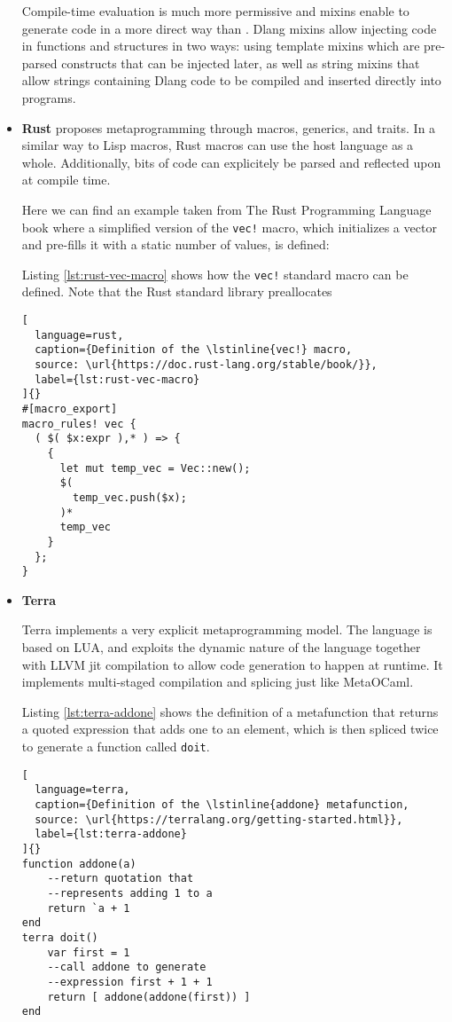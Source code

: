 \documentclass[../main]{subfiles}
\begin{document}
\begin{itemize}
Compile-time evaluation is much more permissive and mixins enable to generate
code in a more direct way than \cpp. Dlang mixins allow injecting code in
functions and structures in two ways: using template mixins
which are pre-parsed constructs that can be injected later,
as well as string mixins that allow strings containing Dlang code
to be compiled and inserted directly into programs.


\item
\textbf{Rust} proposes metaprogramming through macros, generics, and traits.
In a similar way to Lisp macros, Rust macros can use the host language
as a whole. Additionally, bits of code can explicitely be parsed and reflected
upon at compile time.

Here we can find an example taken from The Rust Programming Language
book \cite{rust-book} where a simplified version of the \lstinline{vec!} macro,
which initializes a vector and pre-fills it with a static number of values,
is defined:

Listing \ref{lst:rust-vec-macro} shows how the \lstinline{vec!} standard macro
can be defined. Note that the Rust standard library preallocates

\begin{lstlisting}[
  language=rust,
  caption={Definition of the \lstinline{vec!} macro,
  source: \url{https://doc.rust-lang.org/stable/book/}},
  label={lst:rust-vec-macro}
]{}
#[macro_export]
macro_rules! vec {
  ( $( $x:expr ),* ) => {
    {
      let mut temp_vec = Vec::new();
      $(
        temp_vec.push($x);
      )*
      temp_vec
    }
  };
}
\end{lstlisting}

\item
\textbf{Terra}

Terra\cite{terra} implements a very explicit metaprogramming model.
The language is based on LUA, and exploits the dynamic nature of the language
together with LLVM \gls{jit} compilation to allow code generation
to happen at runtime.
It implements multi-staged compilation and splicing just like MetaOCaml.

Listing \ref{lst:terra-addone} shows the definition of a metafunction that
returns a quoted expression that adds one to an element, which is then spliced
twice to generate a function called \lstinline{doit}.

\begin{lstlisting}[
  language=terra,
  caption={Definition of the \lstinline{addone} metafunction,
  source: \url{https://terralang.org/getting-started.html}},
  label={lst:terra-addone}
]{}
function addone(a)
    --return quotation that
    --represents adding 1 to a
    return `a + 1
end
terra doit()
    var first = 1
    --call addone to generate
    --expression first + 1 + 1
    return [ addone(addone(first)) ]
end
\end{lstlisting}


\end{itemize}
\end{document}
